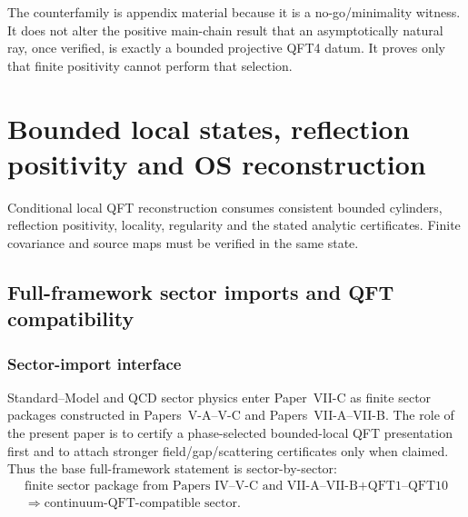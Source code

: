 \documentclass[12pt,a4paper]{article}
\begin{document}
\begin{remark}
The counterfamily is appendix material because it is a no-go/minimality
witness.  It does not alter the positive main-chain result that an
asymptotically natural ray, once verified, is exactly a bounded projective
QFT4 datum.  It proves only that finite positivity cannot perform that
selection.
\end{remark}



\section{Bounded local states, reflection positivity and OS reconstruction}
\label{p12:sec:v237-c3}
Conditional local QFT reconstruction consumes consistent bounded cylinders, reflection positivity, locality, regularity and the stated analytic certificates. Finite covariance and source maps must be verified in the same state.

\subsection{Full-framework sector imports and QFT compatibility}
\label{p12:sec:full-framework-sector-compatibility}


\subsubsection{Sector-import interface}
\label{p12:sec:sector-import-interface}

Standard--Model and QCD sector physics enter Paper~VII-C as finite sector packages constructed in Papers~V-A--V-C and Papers~VII-A--VII-B.  The role of the present paper is to certify a phase-selected bounded-local QFT presentation first and to attach stronger field/gap/scattering certificates only when claimed.  Thus the base full-framework statement is sector-by-sector:
\[
\begin{gathered}
\text{finite sector package from Papers~IV--V-C and VII-A--VII-B}
+\text{QFT1--QFT10}
\\
\Longrightarrow
\text{continuum-QFT-compatible sector}.
\end{gathered}
\]
\end{document}
